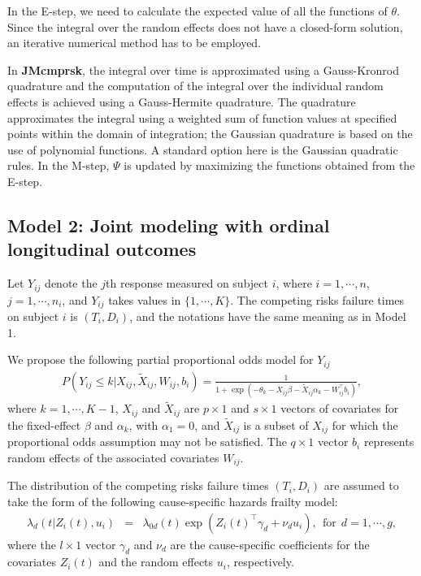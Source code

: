 In the E-step, we need to calculate the expected value of all the functions of $\theta$. Since the integral over the random effects does not have a closed-form solution, an iterative numerical method has to be employed.

In \textbf{JMcmprsk}, the integral over time is approximated using a Gauss-Kronrod quadrature and the computation of the integral over the individual random effects is achieved using a Gauss-Hermite quadrature. The quadrature approximates the integral using a weighted sum of function values at specified points within the domain of integration; the Gaussian quadrature is based on the use of polynomial functions. A standard option here is the Gaussian quadratic rules. In the M-step, $\Psi$ is updated by maximizing the functions obtained from the E-step.

\subsection{Model 2: Joint modeling with ordinal longitudinal  outcomes}

Let $Y_{ij}$ denote the $j$th response measured on subject $i$, where $i=1,\cdots,n$, $j=1,\cdots,n_i$, and $Y_{ij}$ takes values in $\{1,\cdots,K\}$. The competing risks failure times on subject $i$ is $(T_i,D_i)$, and the notations have the same meaning as in Model 1.

We propose the following partial proportional odds model for $Y_{ij}$
\begin{eqnarray*}
P(Y_{ij}\leq k|X_{ij},\tilde X_{ij},W_{ij},b_i)=\frac{1}{1+\exp(-\theta_{k}-X_{ij}\beta-\tilde X_{ij}\alpha_{k}-W_{ij}^\top b_i)},
\end{eqnarray*}
where $k=1,\cdots,K-1$, $X_{ij}$ and $\tilde X_{ij}$ are $p\times 1$ and $s\times 1$ vectors of covariates for the fixed-effect $\beta$ and $\alpha_{k}$, with $\alpha_{1}=0$, and $\tilde X_{ij}$ is a subset of $X_{ij}$ for which the proportional odds assumption may not be satisfied. The $q\times 1$ vector $b_i$ represents random effects of the associated covariates $W_{ij}$.

The distribution of the competing risks failure times $(T_i,D_i)$ are assumed to take the form of the following cause-specific hazards frailty model:
\begin{eqnarray*}
\lambda_d(t|Z_i(t),u_i)&=&\lambda_{0d}(t)\exp(Z_i(t)^\top \gamma_d+\nu_d u_i),~~\mbox{for}~~d=1,\cdots,g,
\end{eqnarray*}
where the $l\times 1$ vector $\gamma_d$ and $\nu_d$ are the cause-specific coefficients for the covariates $Z_i(t)$ and the random effects $u_i$, respectively.

